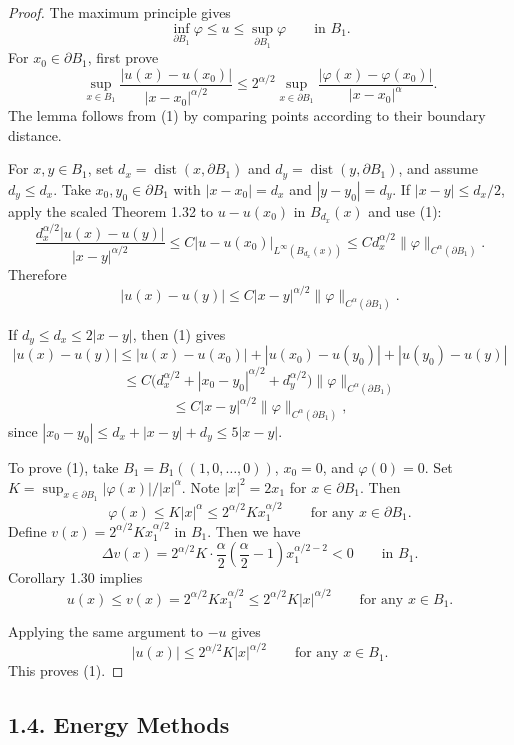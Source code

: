 \begin{proof}
\sketch The maximum principle gives
\[
\inf_{\partial B_1}\varphi \le u \le \sup_{\partial B_1}\varphi \qquad \text{in } B_1.
\]
For $x_0\in\partial B_1$, first prove
\begin{equation}\tag{1}
\sup_{x \in B_1}\frac{|u(x)-u(x_0)|}{|x-x_0|^{\alpha/2}}
\le 2^{\alpha/2}\sup_{x \in \partial B_1}\frac{|\varphi(x)-\varphi(x_0)|}{|x-x_0|^\alpha}.
\end{equation}
The lemma follows from (1) by comparing points according to their boundary
distance.

For $x,y\in B_1$, set $d_x=\operatorname{dist}(x,\partial B_1)$ and
$d_y = \operatorname{dist}(y,\partial B_1)$, and assume $d_y \le d_x$. Take
$x_0,y_0\in\partial B_1$ with $|x-x_0|=d_x$ and $|y-y_0|=d_y$. If
$|x-y|\le d_x/2$, apply the scaled Theorem 1.32 to $u-u(x_0)$ in
$B_{d_x}(x)$ and use (1):
\[
\frac{d_x^{\alpha/2}|u(x)-u(y)|}{|x-y|^{\alpha/2}}
\le C\bigl|u-u(x_0)\bigr|_{L^\infty(B_{d_x}(x))}
\le C d_x^{\alpha/2}\|\varphi\|_{C^\alpha(\partial B_1)}.
\]
Therefore
\[
|u(x)-u(y)| \le C|x-y|^{\alpha/2}\|\varphi\|_{C^\alpha(\partial B_1)}.
\]

If $d_y\le d_x\le2|x-y|$, then (1) gives
\[
|u(x)-u(y)| \le |u(x)-u(x_0)| + |u(x_0)-u(y_0)| + |u(y_0)-u(y)|
\]
\[
\le C\bigl(d_x^{\alpha/2} + |x_0-y_0|^{\alpha/2} + d_y^{\alpha/2}\bigr)\|\varphi\|_{C^\alpha(\partial B_1)}
\]
\[
\le C|x-y|^{\alpha/2}\|\varphi\|_{C^\alpha(\partial B_1)},
\]
since $|x_0-y_0| \le d_x + |x-y| + d_y \le 5|x-y|$.

To prove (1), take $B_1 = B_1((1,0,\dots,0))$, $x_0=0$, and $\varphi(0)=0$. Set
$K=\sup_{x\in \partial B_1}|\varphi(x)|/|x|^\alpha$. Note $|x|^2=2x_1$ for $x\in \partial B_1$.
Then
\[
\varphi(x) \le K|x|^\alpha \le 2^{\alpha/2}Kx_1^{\alpha/2}\qquad \text{for any }x\in\partial B_1.
\]
Define $v(x)=2^{\alpha/2}Kx_1^{\alpha/2}$ in $B_1$. Then we have
\[
\Delta v(x)=2^{\alpha/2}K\cdot \frac{\alpha}{2}\left(\frac{\alpha}{2}-1\right)x_1^{\alpha/2-2}<0
\qquad \text{in }B_1.
\]
Corollary 1.30 implies
\[
u(x)\le v(x)=2^{\alpha/2}Kx_1^{\alpha/2}\le 2^{\alpha/2}K|x|^{\alpha/2}
\qquad \text{for any }x\in B_1.
\]

Applying the same argument to $-u$ gives
\[
|u(x)| \le 2^{\alpha/2}K|x|^{\alpha/2}\qquad \text{for any }x\in B_1.
\]
This proves (1).
\end{proof}

\subsection*{1.4. Energy Methods}


